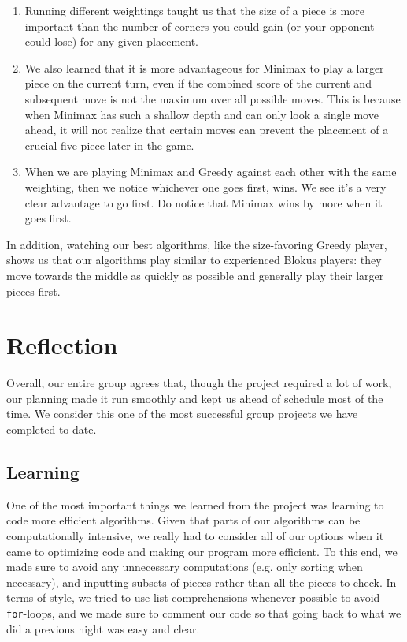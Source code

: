 \documentclass[11pt]{article}
\begin{document}
\begin{enumerate}
	\item Running different weightings taught us that the size of a piece is more important than the number of corners you could gain (or your opponent could lose) for any given placement.
	\item We also learned that it is more advantageous for Minimax to play a larger piece on the current turn, even if the combined score of the current and subsequent move is not the maximum over all possible moves. This is because when Minimax has such a shallow depth and can only look a single move ahead, it will not realize that certain moves can prevent the placement of a crucial five-piece later in the game.
	\item When we are playing Minimax and Greedy against each other with the same weighting, then we notice whichever one goes first, wins. We see it's a very clear advantage to go first. Do notice that Minimax wins by more when it goes first.
\end{enumerate}
In addition, watching our best algorithms, like the size-favoring Greedy player, shows us that our algorithms play similar to experienced Blokus players: they move towards the middle as quickly as possible and generally play their larger pieces first.


\pagebreak


\section{Reflection}

Overall, our entire group agrees that, though the project required a lot of work, our planning made it run smoothly and kept us ahead of schedule most of the time. We consider this one of the most successful group projects we have completed to date.

\subsection{Learning}

One of the most important things we learned from the project was learning to code more efficient algorithms. Given that parts of our algorithms can be computationally intensive, we really had to consider all of our options when it came to optimizing code and making our program more efficient. To this end, we made sure to avoid any unnecessary computations (e.g. only sorting when necessary), and inputting subsets of pieces rather than all the pieces to check. In terms of style, we tried to use list comprehensions whenever possible to avoid \texttt{for}-loops, and we made sure to comment our code so that going back to what we did a previous night was easy and clear.
\end{document}
